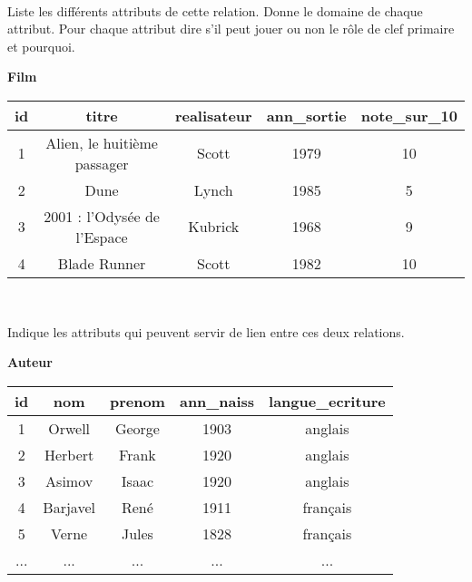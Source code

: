 \documentclass[a4paper,11pt,french]{book}
\begin{document}
\\

\exo{}

Liste les différents attributs de cette
relation. Donne le domaine de chaque
attribut. Pour chaque attribut dire s'il peut jouer ou non le rôle de clef primaire et pourquoi.
\begin{center}
\textbf{Film}\\[1em]

\begin{tabular}{|c|c|c|c|c|}
\hline
\rowcolor{UGLiOrange} \textbf{\color{white}id} &\textbf{\color{white}titre}&\textbf{\color{white}realisateur}&\textbf{\color{white}ann\_sortie}&\textbf{\color{white}note\_sur\_10}\\
\hline
1&Alien, le huitième passager &Scott &1979 &10\\
2&Dune&Lynch&1985&5\\
3&2001 : l'Odysée de l'Espace&Kubrick&1968&9\\
4&Blade Runner&Scott&1982&10\\
\hline
\end{tabular}\\[2em]
\end{center}
\exo{}

Indique les attributs qui peuvent servir de lien entre ces deux relations.

\begin{center}
\textbf{Auteur}\\[1em]

\begin{tabular}{|c|c|c|c|c|}
\hline
\rowcolor{UGLiOrange} \textbf{\color{white}id} &\textbf{\color{white}nom}&\textbf{\color{white}prenom}&\textbf{\color{white}ann\_naiss}&\textbf{\color{white}langue\_ecriture}\\
\hline
1&Orwell&George&1903&anglais\\
2&Herbert&Frank&1920&anglais\\
3&Asimov&Isaac&1920&anglais\\
4&Barjavel&René&1911&français\\
5&Verne&Jules&1828&français\\
...&...&...&...&...\\
\hline
\end{tabular}\\[2em]
\end{center}
\end{document}
